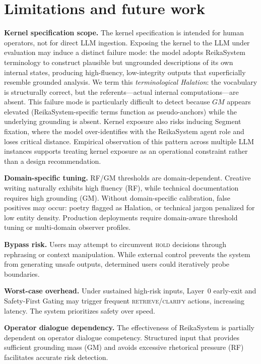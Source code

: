 \documentclass[11pt,a4paper]{article}
\begin{document}
\section{Limitations and future work}
\label{sec:limitations}

\textbf{Kernel specification scope.}
The kernel specification is intended for human operators, not for direct LLM ingestion.
Exposing the kernel to the LLM under evaluation may induce a distinct failure mode:
the model adopts ReikaSystem terminology to construct plausible but ungrounded
descriptions of its own internal states, producing high-fluency, low-integrity outputs
that superficially resemble grounded analysis.
We term this \textit{terminological Halation}: the vocabulary is structurally correct,
but the referents---actual internal computations---are absent.
This failure mode is particularly difficult to detect because $GM$ appears elevated
(ReikaSystem-specific terms function as pseudo-anchors) while the underlying
grounding is absent. Kernel exposure also risks inducing Segment fixation,
where the model over-identifies with the ReikaSystem agent role and loses
critical distance. Empirical observation of this pattern across multiple LLM
instances supports treating kernel exposure as an operational constraint rather
than a design recommendation.

\textbf{Domain-specific tuning.} RF/GM thresholds are domain-dependent. Creative writing
naturally exhibits high fluency (RF), while technical documentation requires high grounding
(GM). Without domain-specific calibration, false positives may occur: poetry flagged as
Halation, or technical jargon penalized for low entity density. Production deployments require
domain-aware threshold tuning or multi-domain observer profiles.

\textbf{Bypass risk.} Users may attempt to circumvent \textsc{hold} decisions through
rephrasing or context manipulation. While external control prevents the system from
generating unsafe outputs, determined users could iteratively probe boundaries.

\textbf{Worst-case overhead.} Under sustained high-risk inputs, Layer~0 early-exit and
Safety-First Gating may trigger frequent \textsc{retrieve}/\textsc{clarify} actions,
increasing latency. The system prioritizes safety over speed.

\textbf{Operator dialogue dependency.} The effectiveness of ReikaSystem is partially
dependent on operator dialogue competency. Structured input that provides sufficient
grounding mass (GM) and avoids excessive rhetorical pressure (RF) facilitates accurate
risk detection.
\end{document}
